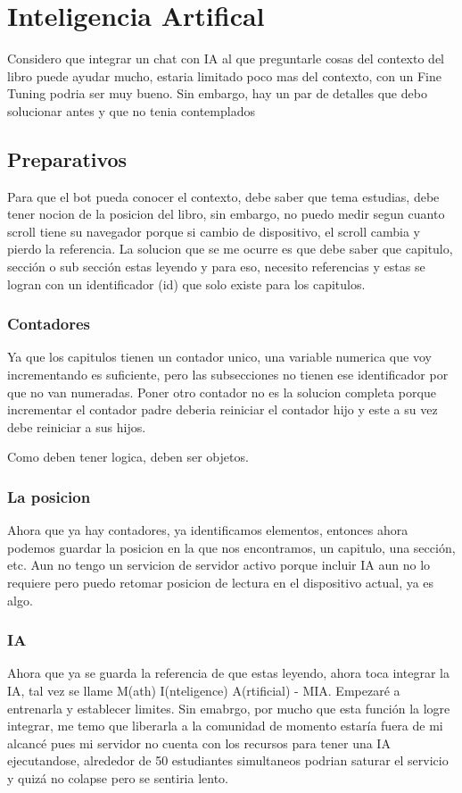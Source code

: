 \chapter{Inteligencia Artifical}

Considero que integrar un chat con IA al que preguntarle cosas del contexto
del libro puede ayudar mucho, estaria limitado poco mas del contexto, con un
Fine Tuning podria ser muy bueno. Sin embargo, hay un par de detalles que
debo solucionar antes y que no tenia contemplados

\section{ Preparativos }

Para que el bot pueda conocer el contexto, debe saber que tema estudias, debe
tener nocion de la posicion del libro, sin embargo, no puedo medir segun cuanto
scroll tiene su navegador porque si cambio de dispositivo, el scroll cambia
y pierdo la referencia. La solucion que se me ocurre es que debe saber que
capitulo, sección o sub sección estas leyendo y para eso, necesito referencias
y estas se logran con un identificador (id) que solo existe para los capitulos.

\subsection{ Contadores }

Ya que los capitulos tienen un contador unico, una variable numerica que voy
incrementando es suficiente, pero las subsecciones no tienen ese identificador
por que no van numeradas. Poner otro contador no es la solucion completa porque
incrementar el contador padre deberia reiniciar el contador hijo y este a su
vez debe reiniciar a sus hijos.

Como deben tener logica, deben ser objetos.

\subsection{ La posicion }

Ahora que ya hay contadores, ya identificamos elementos, entonces ahora podemos
guardar la posicion en la que nos encontramos, un capitulo, una sección, etc.
Aun no tengo un servicion de servidor activo porque incluir IA aun no lo
requiere pero puedo retomar posicion de lectura en el dispositivo actual, ya
es algo.

\subsection{ IA }

Ahora que ya se guarda la referencia de que estas leyendo, ahora toca integrar
la IA, tal vez se llame M(ath) I(nteligence) A(rtificial) - MIA. Empezaré a
entrenarla y establecer limites. Sin emabrgo, por mucho que esta función la
logre integrar, me temo que liberarla a la comunidad de momento estaría fuera
de mi alcancé pues mi servidor no cuenta con los recursos para tener una IA
ejecutandose, alrededor de 50 estudiantes simultaneos podrian saturar el
servicio y quizá no colapse pero se sentiria lento.